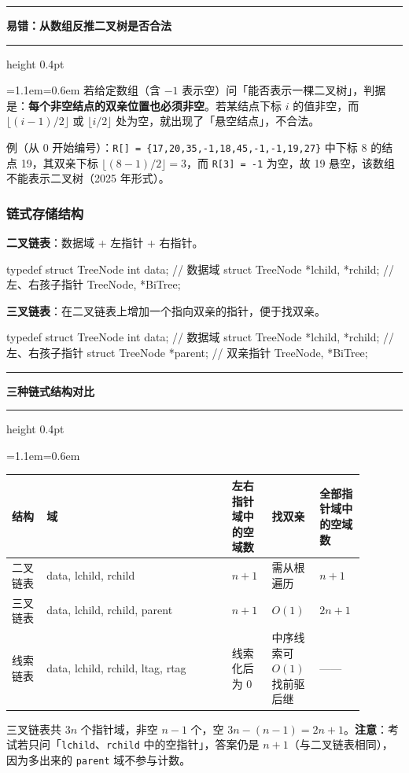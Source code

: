 \documentclass[11pt,openany,UTF8]{ctexbook}
\newcommand{\callouthead}[2]{%
  \par\addvspace{7pt}\noindent
  {\color{#1}\rule[-0.15em]{3pt}{1.05em}}\hspace{0.5em}%
  {\bfseries\color{#1}#2}\par\nobreak\vspace{-0.35em}%
  {\color{rulesep}\hrule height 0.4pt}\nobreak\vspace{0.45em}%
  \begingroup\small\setlength{\parindent}{0pt}%
  \leftskip=1.1em\rightskip=0.6em\noindent\ignorespaces}
\newcommand{\calloutend}{\par\endgroup\addvspace{7pt}}
\newenvironment{callkey}[1]{\callouthead{keybar}{#1}}{\calloutend}
\newenvironment{callwarn}[1]{\callouthead{warnbar}{#1}}{\calloutend}
\begin{document}
\begin{callwarn}{易错：从数组反推二叉树是否合法}
若给定数组（含 $-1$ 表示空）问「能否表示一棵二叉树」，判据是：\textbf{每个非空结点的双亲位置也必须非空}。若某结点下标 $i$ 的值非空，而 $\lfloor(i-1)/2\rfloor$ 或 $\lfloor i/2\rfloor$ 处为空，就出现了「悬空结点」，不合法。

例（从 0 开始编号）：\texttt{R[]\allowbreak{} =\allowbreak{} \{17,\allowbreak{}20,\allowbreak{}35,\allowbreak{}-1,\allowbreak{}18,\allowbreak{}45,\allowbreak{}-1,\allowbreak{}-1,\allowbreak{}19,\allowbreak{}27\}} 中下标 8 的结点 19，其双亲下标 $\lfloor(8-1)/2\rfloor=3$，而 \texttt{R[3]\allowbreak{} =\allowbreak{} -1} 为空，故 19 悬空，该数组不能表示二叉树（2025 年形式）。

\end{callwarn}

\subsubsection{链式存储结构}

\textbf{二叉链表}：数据域 + 左指针 + 右指针。

\begin{codebox}
typedef struct TreeNode {
    int data;                          // 数据域
    struct TreeNode *lchild, *rchild;  // 左、右孩子指针
} TreeNode, *BiTree;
\end{codebox}

\textbf{三叉链表}：在二叉链表上增加一个指向双亲的指针，便于找双亲。

\begin{codebox}
typedef struct TreeNode {
    int data;                          // 数据域
    struct TreeNode *lchild, *rchild;  // 左、右孩子指针
    struct TreeNode *parent;           // 双亲指针
} TreeNode, *BiTree;
\end{codebox}

\begin{callkey}{三种链式结构对比}
\begingroup\small\setlength{\tabcolsep}{4.0pt}
\begin{longtable}{@{}L{0.0954\linewidth}L{0.4828\linewidth}L{0.1013\linewidth}L{0.1192\linewidth}L{0.0954\linewidth}@{}}
\toprule
\textbf{结构} & \textbf{域} & \textbf{左右指针域中的空域数} & \textbf{找双亲} & \textbf{全部指针域中的空域数} \\
\midrule
\endhead
二叉链表 & data, lchild, rchild & $n+1$ & 需从根遍历 & $n+1$ \\
三叉链表 & data, lchild, rchild, parent & $n+1$ & $O(1)$ & $2n+1$ \\
线索链表 & data, lchild, rchild, ltag, rtag & 线索化后为 0 & 中序线索可 $O(1)$ 找前驱后继 & —— \\
\bottomrule
\end{longtable}
\endgroup

三叉链表共 $3n$ 个指针域，非空 $n-1$ 个，空 $3n-(n-1)=2n+1$。\textbf{注意}：考试若只问「\texttt{lchild}、\texttt{rchild} 中的空指针」，答案仍是 $n+1$（与二叉链表相同），因为多出来的 \texttt{parent} 域不参与计数。

\end{callkey}
\end{document}
